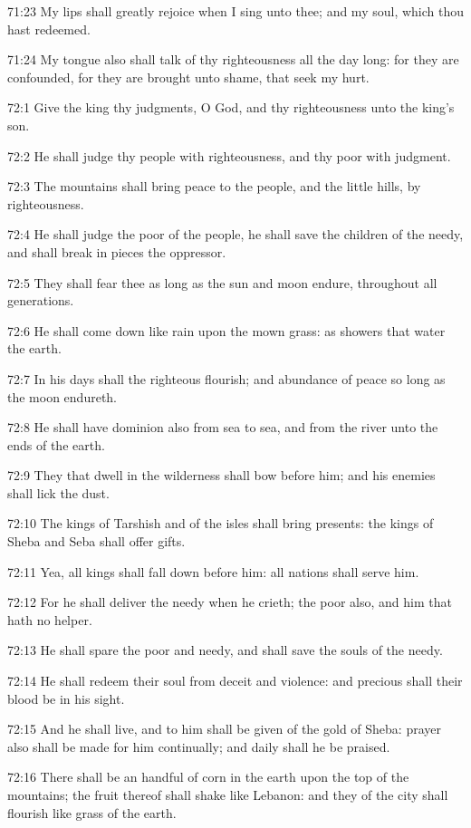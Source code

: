 71:23 My lips shall greatly rejoice when I sing unto thee; and my
soul, which thou hast redeemed.

71:24 My tongue also shall talk of thy righteousness all the day long:
for they are confounded, for they are brought unto shame, that seek my
hurt.



72:1 Give the king thy judgments, O God, and thy righteousness unto
the king's son.

72:2 He shall judge thy people with righteousness, and thy poor with
judgment.

72:3 The mountains shall bring peace to the people, and the little
hills, by righteousness.

72:4 He shall judge the poor of the people, he shall save the children
of the needy, and shall break in pieces the oppressor.

72:5 They shall fear thee as long as the sun and moon endure,
throughout all generations.

72:6 He shall come down like rain upon the mown grass: as showers that
water the earth.

72:7 In his days shall the righteous flourish; and abundance of peace
so long as the moon endureth.

72:8 He shall have dominion also from sea to sea, and from the river
unto the ends of the earth.

72:9 They that dwell in the wilderness shall bow before him; and his
enemies shall lick the dust.

72:10 The kings of Tarshish and of the isles shall bring presents: the
kings of Sheba and Seba shall offer gifts.

72:11 Yea, all kings shall fall down before him: all nations shall
serve him.

72:12 For he shall deliver the needy when he crieth; the poor also,
and him that hath no helper.

72:13 He shall spare the poor and needy, and shall save the souls of
the needy.

72:14 He shall redeem their soul from deceit and violence: and
precious shall their blood be in his sight.

72:15 And he shall live, and to him shall be given of the gold of
Sheba: prayer also shall be made for him continually; and daily shall
he be praised.

72:16 There shall be an handful of corn in the earth upon the top of
the mountains; the fruit thereof shall shake like Lebanon: and they of
the city shall flourish like grass of the earth.

